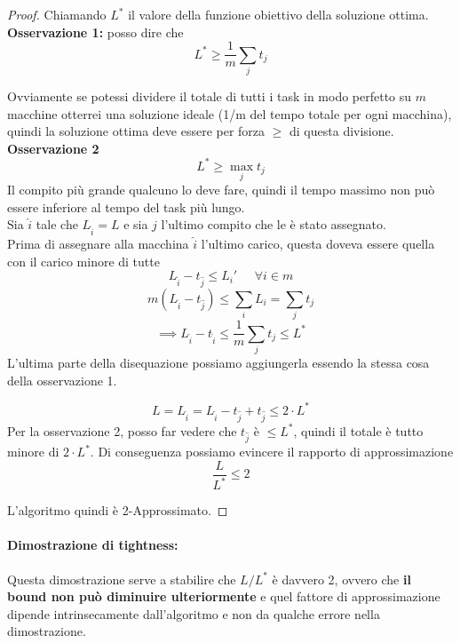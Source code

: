 \begin{proof}
	Chiamando $L^\ast$ il valore della funzione obiettivo della soluzione ottima. \\
	
	\textbf{Osservazione 1:} posso dire che 
	$$ L^\ast \geq \frac{1}{m} \sum_{j} t_j $$
	
	Ovviamente se potessi dividere il totale di tutti i task in modo perfetto su $m$ macchine otterrei una soluzione ideale (1/m del tempo totale per ogni macchina), quindi la soluzione ottima deve essere per forza $\geq$ di questa divisione.\\
	
	\textbf{Osservazione 2 }
	$$ L^\ast \geq \max_j t_j $$
	Il compito più grande qualcuno lo deve fare, quindi il tempo massimo non può essere inferiore al tempo del task più lungo.\\
	
	Sia $\hat{i}$ tale che $L_{\hat{i}} = L$ e sia $\hat{j}$ l'ultimo compito che le è stato assegnato.\\
	
	Prima di assegnare alla macchina $\hat{i}$ l'ultimo carico, questa doveva essere quella con il carico minore di tutte
	$$ L_{\hat{i}} - t_{\hat{j}} \leq L_i ' \;\;\;\;\; \forall i \in m $$
	$$ m (L_{\hat{i}} - t_{\hat{j}}) \leq \sum_i L_i = \sum_j t_j $$
	$$ \implies L_{\hat{i}} - t_{\hat{i}} \leq \frac{1}{m} \sum_j t_j \leq L^\ast $$
	L'ultima parte della disequazione possiamo aggiungerla essendo la stessa cosa della osservazione 1.
	
	$$ L = L_{\hat{i}} = L_{\hat{i}} - t_{\hat{j}} + t_{\hat{j}} \leq 2 \cdot L^\ast $$
	Per la osservazione 2, posso far vedere che $t_{\hat{j}}$ è $\leq L^\ast$, quindi il totale è tutto minore di $2 \cdot L^\ast$. Di conseguenza possiamo evincere il rapporto di approssimazione
	$$ \frac{L}{L^\ast} \leq 2 $$
	
	L'algoritmo quindi è 2-Approssimato.
\end{proof}

\newpage

\paragraph{Dimostrazione di tightness:} Questa dimostrazione serve a stabilire che $L/L^\ast$ è davvero 2, ovvero che \textbf{il bound non può diminuire ulteriormente} e quel fattore di approssimazione dipende intrinsecamente dall'algoritmo e non da qualche errore nella dimostrazione.\\

